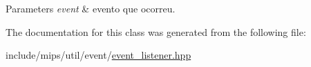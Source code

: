\begin{DoxyParams}{Parameters}
{\em event} & evento que ocorreu. \\
\hline
\end{DoxyParams}


The documentation for this class was generated from the following file\+:\begin{DoxyCompactItemize}
\item 
include/mips/util/event/\hyperlink{event__listener_8hpp}{event\+\_\+listener.\+hpp}\end{DoxyCompactItemize}
